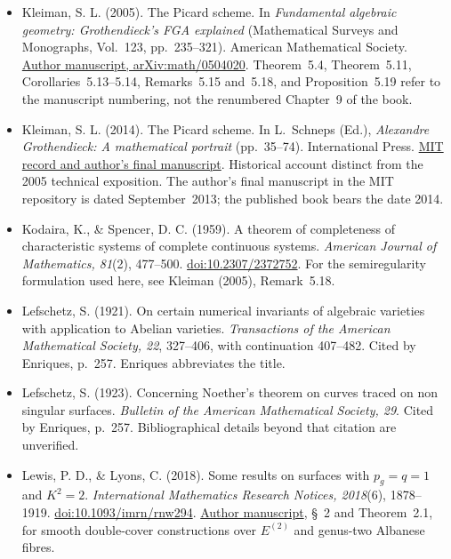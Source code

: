 \begin{sloppypar}
\begin{itemize}
\item Kleiman, S. L. (2005). The Picard scheme. In \emph{Fundamental algebraic geometry: Grothendieck's FGA explained} (Mathematical Surveys and Monographs, Vol.~123, pp.~235--321). American Mathematical Society. \href{https://arxiv.org/abs/math/0504020}{Author manuscript, arXiv:math/0504020}. Theorem~5.4, Theorem~5.11, Corollaries~5.13--5.14, Remarks~5.15 and~5.18, and Proposition~5.19 refer to the manuscript numbering, not the renumbered Chapter~9 of the book.

\item Kleiman, S. L. (2014). The Picard scheme. In L.~Schneps (Ed.), \emph{Alexandre Grothendieck: A mathematical portrait} (pp.~35--74). International Press. \href{https://dspace.mit.edu/entities/publication/b19e8bf7-8b44-404b-b54c-ddceddc1a5d9}{MIT record and author's final manuscript}. Historical account distinct from the 2005 technical exposition. The author's final manuscript in the MIT repository is dated September~2013; the published book bears the date 2014.

\item Kodaira, K., \& Spencer, D. C. (1959). A theorem of completeness of characteristic systems of complete continuous systems. \emph{American Journal of Mathematics, 81}(2), 477--500. \href{https://doi.org/10.2307/2372752}{doi:10.2307/2372752}. For the semiregularity formulation used here, see Kleiman (2005), Remark~5.18.

\item Lefschetz, S. (1921). On certain numerical invariants of algebraic varieties with application to Abelian varieties. \emph{Transactions of the American Mathematical Society, 22}, 327--406, with continuation 407--482. Cited by Enriques, p.~257. Enriques abbreviates the title.

\item Lefschetz, S. (1923). Concerning Noether's theorem on curves traced on non singular surfaces. \emph{Bulletin of the American Mathematical Society, 29}. Cited by Enriques, p.~257. Bibliographical details beyond that citation are unverified.

\item Lewis, P. D., \& Lyons, C. (2018). Some results on surfaces with $p_g=q=1$ and $K^2=2$. \emph{International Mathematics Research Notices, 2018}(6), 1878--1919. \href{https://doi.org/10.1093/imrn/rnw294}{doi:10.1093/imrn/rnw294}. \href{https://arxiv.org/abs/1508.01863}{Author manuscript}, \S~2 and Theorem~2.1, for smooth double-cover constructions over $E^{(2)}$ and genus-two Albanese fibres.


\end{itemize}
\end{sloppypar}
